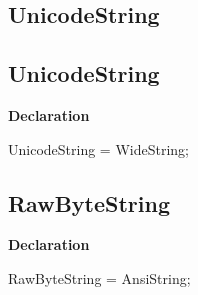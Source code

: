 \documentclass{report}
\newif\ifpdf
\begin{document}
\subsection*{\large{\textbf{UnicodeString}}\normalsize\hspace{1ex}\hrulefill}
\else
\subsection*{UnicodeString}
\fi
\label{PasDoc_Types-UnicodeString}
\begin{list}{}{
\setlength{\itemindent}{0cm}
\setlength{\listparindent}{0cm}
\setlength{\leftmargin}{\evensidemargin}
\addtolength{\leftmargin}{\tmplength}
\settowidth{\labelsep}{X}
\addtolength{\leftmargin}{\labelsep}
\setlength{\labelwidth}{\tmplength}
}
\item[\textbf{Declaration}\hfill]
\ifpdf
\begin{flushleft}
\fi
\begin{ttfamily}
UnicodeString = WideString;\end{ttfamily}

\ifpdf
\end{flushleft}
\fi

\end{list}
\ifpdf
\subsection*{\large{\textbf{RawByteString}}\normalsize\hspace{1ex}\hrulefill}
\else
\subsection*{RawByteString}
\fi
\label{PasDoc_Types-RawByteString}
\begin{list}{}{
\setlength{\itemindent}{0cm}
\setlength{\listparindent}{0cm}
\setlength{\leftmargin}{\evensidemargin}
\addtolength{\leftmargin}{\tmplength}
\settowidth{\labelsep}{X}
\addtolength{\leftmargin}{\labelsep}
\setlength{\labelwidth}{\tmplength}
}
\item[\textbf{Declaration}\hfill]
\ifpdf
\begin{flushleft}
\fi
\begin{ttfamily}
RawByteString = AnsiString;\end{ttfamily}

\ifpdf
\end{flushleft}
\fi

\end{list}
\ifpdf
\end{document}
